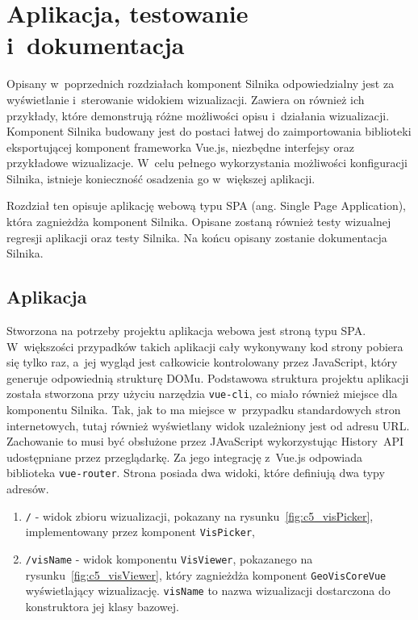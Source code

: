 \chapter{Aplikacja, testowanie i~dokumentacja}

Opisany w~poprzednich rozdziałach komponent Silnika odpowiedzialny jest za wyświetlanie i~sterowanie widokiem wizualizacji. Zawiera on również ich przykłady, które demonstrują różne możliwości opisu i~działania wizualizacji. Komponent Silnika budowany jest do postaci łatwej do zaimportowania biblioteki eksportującej komponent frameworka Vue.js, niezbędne interfejsy oraz przykładowe wizualizacje. W~celu pełnego wykorzystania możliwości konfiguracji Silnika, istnieje konieczność osadzenia go w~większej aplikacji.

Rozdział ten opisuje aplikację webową typu SPA (ang. Single Page Application), która zagnieżdża komponent Silnika. Opisane zostaną również testy wizualnej regresji aplikacji oraz testy Silnika. Na końcu opisany zostanie dokumentacja Silnika.

\section{Aplikacja}
Stworzona na potrzeby projektu aplikacja webowa jest stroną typu SPA. W~większości przypadków takich aplikacji cały wykonywany kod strony pobiera się tylko raz, a~jej wygląd jest całkowicie kontrolowany przez JavaScript, który generuje odpowiednią strukturę DOMu. Podstawowa struktura projektu aplikacji została stworzona przy użyciu narzędzia \texttt{vue-cli}, co miało również miejsce dla komponentu Silnika. Tak, jak to ma miejsce w~przypadku standardowych stron internetowych, tutaj również wyświetlany widok uzależniony jest od adresu URL. Zachowanie to musi być obsłużone przez JAvaScript wykorzystując History~API ~\cite{HistoryAPI} udostępniane przez przeglądarkę. Za jego integrację z~Vue.js odpowiada biblioteka \texttt{vue-router}. Strona posiada dwa widoki, które definiują dwa typy adresów.

\begin{enumerate}
    \item \texttt{/} - widok zbioru wizualizacji, pokazany na rysunku~\ref{fig:c5_visPicker}, implementowany przez komponent \texttt{VisPicker},
    \item \texttt{/visName} - widok komponentu \texttt{VisViewer}, pokazanego na rysunku~\ref{fig:c5_visViewer}, który zagnieżdża komponent \texttt{GeoVisCoreVue} wyświetlający wizualizację. \texttt{visName} to nazwa wizualizacji dostarczona do konstruktora jej klasy bazowej.
\end{enumerate}

